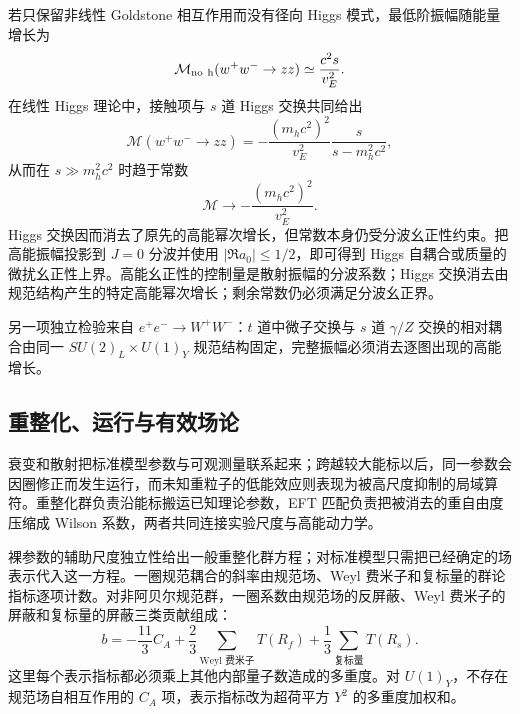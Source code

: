 若只保留非线性 Goldstone 相互作用而没有径向 Higgs 模式，最低阶振幅随能量增长为
\begin{equation*}
\mathcal M_{\rm no\ h}(w^+w^-\to zz)\simeq\frac{c^2s}{v_E^2}.
\end{equation*}
在线性 Higgs 理论中，接触项与 $s$ 道 Higgs 交换共同给出
\begin{equation}
\mathcal M(w^+w^-\to zz)
=-\frac{(m_hc^2)^2}{v_E^2}\frac{s}{s-m_h^2c^2},
\label{eq:ww-higgs-full-amplitude-dp32}
\end{equation}
从而在 $s\gg m_h^2c^2$ 时趋于常数
\begin{equation}
{
\mathcal M\longrightarrow-\frac{(m_hc^2)^2}{v_E^2}.}
\label{eq:ww-high-energy-constant-dp11}
\end{equation}
Higgs 交换因而消去了原先的高能幂次增长，但常数本身仍受分波幺正性约束。把高能振幅投影到 $J=0$ 分波并使用 $|\Re a_0|\le1/2$，即可得到 Higgs 自耦合或质量的微扰幺正性上界。高能幺正性的控制量是散射振幅的分波系数；Higgs 交换消去由规范结构产生的特定高能幂次增长；剩余常数仍必须满足分波幺正界。

另一项独立检验来自 $e^+e^-\to W^+W^-$：$t$ 道中微子交换与 $s$ 道 $\gamma/Z$ 交换的相对耦合由同一 $SU(2)_L\times U(1)_Y$ 规范结构固定，完整振幅必须消去逐图出现的高能增长。







\subsection{重整化、运行与有效场论}

衰变和散射把标准模型参数与可观测量联系起来；跨越较大能标以后，同一参数会因圈修正而发生运行，而未知重粒子的低能效应则表现为被高尺度抑制的局域算符。重整化群负责沿能标搬运已知理论参数，EFT 匹配负责把被消去的重自由度压缩成 Wilson 系数，两者共同连接实验尺度与高能动力学。




裸参数的辅助尺度独立性给出一般重整化群方程；对标准模型只需把已经确定的场表示代入这一方程。一圈规范耦合的斜率由规范场、Weyl 费米子和复标量的群论指标逐项计数。对非阿贝尔规范群，一圈系数由规范场的反屏蔽、Weyl 费米子的屏蔽和复标量的屏蔽三类贡献组成：
\begin{equation}
{
b=-\frac{11}{3}C_A
+\frac23\sum_{\text{Weyl 费米子}}T(R_f)
+\frac13\sum_{\text{复标量}}T(R_s).}
\label{eq:general-gauge-beta-weyl-scalar-dp11}
\end{equation}
这里每个表示指标都必须乘上其他内部量子数造成的多重度。对 $U(1)_Y$，不存在规范场自相互作用的 $C_A$ 项，表示指标改为超荷平方 $Y^2$ 的多重度加权和。

